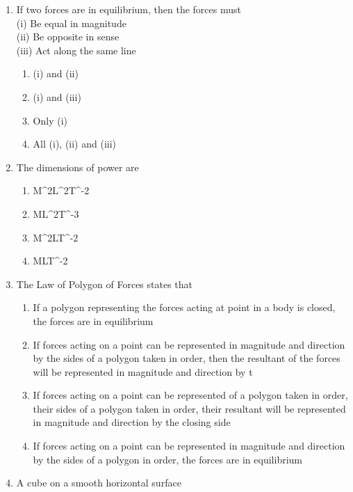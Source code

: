 \documentclass[11pt,a4paper]{article}
\begin{document}
\begin{enumerate}
\item{If two forces are in equilibrium, then the forces must \\
 (i) Be equal in magnitude \\
 (ii) Be opposite in sense \\
 (iii) Act along the same line}
\begin{enumerate}[label=\Alph*.]
\item{(i) and (ii)}
\item{(i) and (iii)}
\item{Only (i)}
\item{All (i), (ii) and (iii)}
\end{enumerate}
\item{The dimensions of power are}
\begin{enumerate}[label=\Alph*.]
\item{M\^{}2L\^{}2T\^{}-2}
\item{ML\^{}2T\^{}-3}
\item{M\^{}2LT\^{}-2}
\item{MLT\^{}-2}
\end{enumerate}
\item{The Law of Polygon of Forces states that}
\begin{enumerate}[label=\Alph*.]
\item{If a polygon representing the forces acting at point in a body is closed, the forces are in equilibrium}
\item{If forces acting on a point can be represented in magnitude and direction by the sides of a polygon taken in order, then the resultant of the forces will be represented in magnitude and direction by t}
\item{If forces acting on a point can be represented of a polygon taken in order, their sides of a polygon taken in order, their resultant will be represented in magnitude and direction by the closing side }
\item{If forces acting on a point can be represented in magnitude and direction by the sides of a polygon in order, the forces are in equilibrium}
\end{enumerate}
\item{A cube on a smooth horizontal surface}
\begin{enumerate}[label=\Alph*.]

\end{enumerate}
\end{enumerate}
\end{document}
